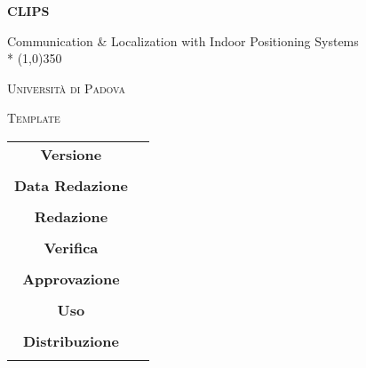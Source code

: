 \documentclass[a4paper,12pt]{article}
\author{Nome Autore}
\date{05/01/2016}
\begin{document}
\begin{titlepage}
	\centering
	{\huge\bfseries CLIPS\par}
	Communication \& Localization with Indoor Positioning Systems \\*
	\line(1,0){350} \\
	{\scshape\LARGE Università di Padova \par}
	\vspace{1cm}
	{\scshape\Large Template \par}
	\logo
	\newpage
		\begin{tabular}{c|c}
			{\hfill \textbf{Versione}} 			& 					\\ \\
			{\hfill\textbf{Data Redazione}} 	&            		\\ \\
			{\hfill\textbf{Redazione}} 			&  					\\ \\
			{\hfill\textbf{Verifica}} 			&  					\\ \\
			{\hfill\textbf{Approvazione}} 		&  					\\ \\
			{\hfill\textbf{Uso}} 				& 					\\ \\
			{\hfill\textbf{Distribuzione}} 		& 					\\ \\
		\end{tabular}
	\end{titlepage}
	
	\newpage
	\pagestyle{myfront}
	
	\newpage
		\tableofcontents
	\newpage
		\listoffigures	
	\label{LastFrontPage}
	\newpage
	
	\pagestyle{mymain}
	
	 \newpage
		

	\newpage
		
	
	\newpage
		
	
	\newpage
		

	
	\newpage
		

	\newpage
		
	
	\newpage
		
	
	\newpage
		

		
	\label{LastPage}
\end{document}
